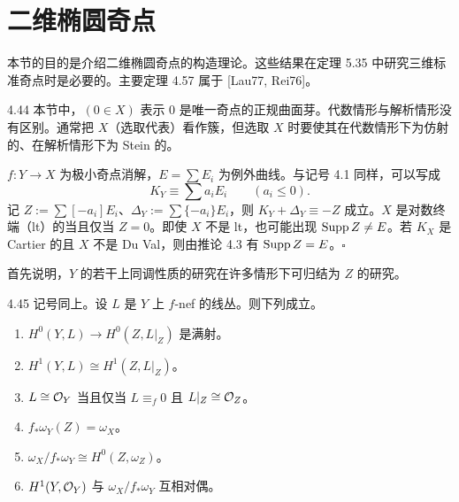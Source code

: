 \section{二维椭圆奇点}


本节的目的是介绍二维椭圆奇点的构造理论。这些结果在定理 5.35 中研究三维标准奇点时是必要的。主要定理 4.57 属于 [Lau77, Rei76]。

\begin{notation}{4.44}
本节中，$(0\in X)$ 表示 $0$ 是唯一奇点的正规曲面芽。代数情形与解析情形没有区别。通常把 $X$（选取代表）看作簇，但选取 $X$ 时要使其在代数情形下为仿射的、在解析情形下为 Stein 的。

$f\colon Y\to X$ 为极小奇点消解，$E=\sum E_i$ 为例外曲线。与记号 4.1 同样，可以写成
\[ K_Y\equiv\sum a_iE_i\qquad (a_i\le 0). \]
记 $Z:=\sum[-a_i]E_i$、$\Delta_Y:=\sum\{-a_i\}E_i$，则 $K_Y+\Delta_Y\equiv -Z$ 成立。$X$ 是对数终端（lt）的当且仅当 $Z=0$。即使 $X$ 不是 lt，也可能出现 $\operatorname{Supp} Z\neq E$。若 $K_X$ 是 Cartier 的且 $X$ 不是 Du Val，则由推论 4.3 有 $\operatorname{Supp} Z=E$。\hfill$\square$
\end{notation}

首先说明，$Y$ 的若干上同调性质的研究在许多情形下可归结为 $Z$ 的研究。

\begin{propositionp}{4.45}
记号同上。设 $L$ 是 $Y$ 上 $f$-nef 的线丛。则下列成立。
\begin{enumerate}[label=(\arabic*),leftmargin=2.4em,itemsep=1pt,topsep=2pt]
\item $H^0(Y,L)\to H^0(Z,L|_Z)$ 是满射。
\item $H^1(Y,L)\cong H^1(Z,L|_Z)$。
\item $L\cong\mathcal{O}_Y$ 当且仅当 $L\equiv_f 0$ 且 $L|_Z\cong\mathcal{O}_Z$。
\item $f_*\omega_Y(Z)=\omega_X$。
\item $\omega_X/f_*\omega_Y\cong H^0(Z,\omega_Z)$。
\item $H^1(Y,\mathcal{O}_Y)$ 与 $\omega_X/f_*\omega_Y$ 互相对偶。
\end{enumerate}
\end{propositionp}

